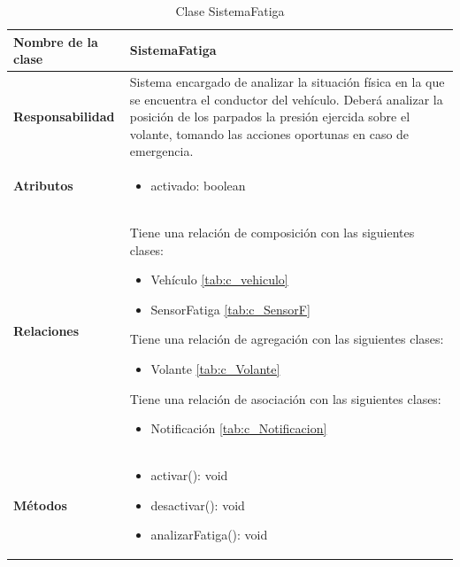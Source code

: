 \begin{table}[h]
\begin{center}
\begin{tabular}{p{} p{11cm}}
\textbf{Nombre de la clase} &  SistemaFatiga\\ \hline \hline
\textbf{Responsabilidad} &  Sistema encargado de analizar la situación física en la que se encuentra el conductor del vehículo. Deberá analizar la posición de los parpados la presión ejercida sobre el volante, tomando las acciones oportunas en caso de emergencia.  \\ \hline
\textbf{Atributos} & \begin{itemize}
                      \item activado: boolean
                    \end{itemize}\\ \hline
\textbf{Relaciones} & \par Tiene una relación de composición con las siguientes clases:
                      \begin{itemize}
                        \item Vehículo \ref{tab:c_vehiculo}
                        \item SensorFatiga \ref{tab:c_SensorF}
                      \end{itemize}

                      \par Tiene una relación de agregación con las siguientes clases:
                      \begin{itemize}
                        \item Volante \ref{tab:c_Volante}
                      \end{itemize}

                      \par Tiene una relación de asociación con las siguientes clases:
                      \begin{itemize}
                        \item Notificación \ref{tab:c_Notificacion}
                      \end{itemize}


                      \\ \hline

\textbf{Métodos} &  \begin{itemize}
                      \item activar(): void
                      \item desactivar(): void
                      \item analizarFatiga(): void
                    \end{itemize}\\ \hline
\end{tabular}
\caption{Clase SistemaFatiga}
\label{tab:c_SFatiga}
\end{center}
\end{table}












